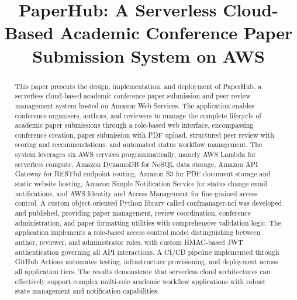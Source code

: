 \documentclass[conference]{IEEEtran}
\begin{document}
\title{PaperHub: A Serverless Cloud-Based Academic Conference Paper Submission System on AWS}

\author{
}

\maketitle

\begin{abstract}
This paper presents the design, implementation, and deployment of PaperHub, a serverless cloud-based academic conference paper submission and peer review management system hosted on Amazon Web Services. The application enables conference organisers, authors, and reviewers to manage the complete lifecycle of academic paper submissions through a role-based web interface, encompassing conference creation, paper submission with PDF upload, structured peer review with scoring and recommendations, and automated status workflow management. The system leverages six AWS services programmatically, namely AWS Lambda for serverless compute, Amazon DynamoDB for NoSQL data storage, Amazon API Gateway for RESTful endpoint routing, Amazon S3 for PDF document storage and static website hosting, Amazon Simple Notification Service for status change email notifications, and AWS Identity and Access Management for fine-grained access control. A custom object-oriented Python library called confmanager-nci was developed and published, providing paper management, review coordination, conference administration, and paper formatting utilities with comprehensive validation logic. The application implements a role-based access control model distinguishing between author, reviewer, and administrator roles, with custom HMAC-based JWT authentication governing all API interactions. A CI/CD pipeline implemented through GitHub Actions automates testing, infrastructure provisioning, and deployment across all application tiers. The results demonstrate that serverless cloud architectures can effectively support complex multi-role academic workflow applications with robust state management and notification capabilities.
\end{abstract}
\end{document}

